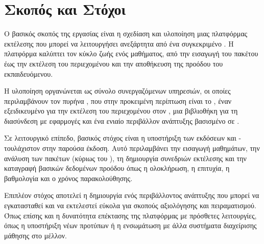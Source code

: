 \section{Σκοπός και Στόχοι}

Ο βασικός σκοπός της εργασίας είναι η σχεδίαση και υλοποίηση μιας πλατφόρμας εκτέλεσης  που
μπορεί να λειτουργήσει ανεξάρτητα από ένα συγκεκριμένο . Η πλατφόρμα καλύπτει τον κύκλο ζωής ενός
μαθήματος, από την εισαγωγή του πακέτου έως την εκτέλεση του περιεχομένου και την αποθήκευση της προόδου του
εκπαιδευόμενου.

Η υλοποίηση οργανώνεται ως σύνολο συνεργαζόμενων υπηρεσιών, οι οποίες περιλαμβάνουν τον πυρήνα
, που στην προκειμένη περίπτωση είναι το , έναν εξειδικευμένο  για την εκτέλεση του περιεχομένου στον ,
μια βιβλιοθήκη  για τη διασύνδεση με εφαρμογές  και ένα ενιαίο περιβάλλον
ανάπτυξης βασισμένο σε .

Σε λειτουργικό επίπεδο, βασικός στόχος είναι η υποστήριξη των εκδόσεων  και  - τουλάχιστον στην παρούσα έκδοση.
Αυτό περιλαμβάνει την εισαγωγή μαθημάτων, την ανάλυση των πακέτων (κύριως του ), τη δημιουργία συνεδριών
εκτέλεσης και την καταγραφή βασικών δεδομένων προόδου όπως η ολοκλήρωση, η επιτυχία, η βαθμολογία και ο χρόνος παρακολούθησης.

Επιπλέον στόχος αποτελεί η δημιουργία ενός περιβάλλοντος ανάπτυξης που μπορεί να εγκατασταθεί και να
εκτελεστεί εύκολα για σκοπούς αξιολόγησης και πειραματισμού. Όπως επίσης και η δυνατότητα επέκτασης της πλατφόρμας με πρόσθετες λειτουργίες, 
όπως η υποστήριξη νέων προτύπων ή η ενσωμάτωση με άλλα συστήματα διαχείρισης μάθησης στο μέλλον.
